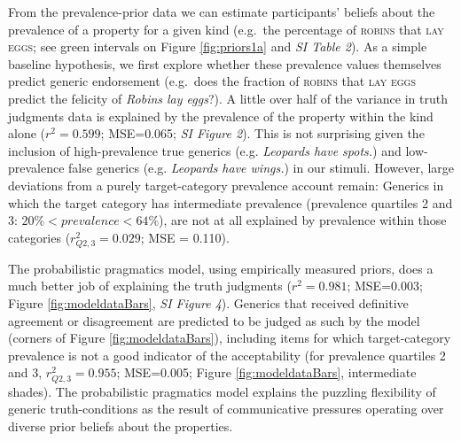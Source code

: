 \documentclass{pnastwo}
\begin{document}
\begin{article}
From the prevalence-prior data we can estimate participants' beliefs about the prevalence of a property for a given kind (e.g.~the percentage of \textsc{robins} that \textsc{lay eggs}; see green intervals on Figure \ref{fig:priors1a} and \emph{SI Table 2}).
As a simple baseline hypothesis, we first explore whether these prevalence values themselves predict generic endorsement (e.g.~does the fraction of \textsc{robins} that \textsc{lay eggs} predict the felicity of \emph{Robins lay eggs}?).
A little over half of the variance in truth judgments data is explained by the prevalence of the property within the kind alone ($r^2 = 0.599$; MSE=0.065; \emph{SI Figure 2}). 
This is not surprising given the inclusion of high-prevalence true generics (e.g. \emph{Leopards have spots.}) and low-prevalence false generics (e.g. \emph{Leopards have wings.}) in our stimuli. 
However, large deviations from a purely target-category prevalence account remain: Generics in which the target category has intermediate prevalence (prevalence quartiles 2 and 3: $ 20\% < prevalence < 64\%$), are not at all explained by prevalence within those categories ($r_{Q2,3}^2 = 0.029$; MSE = 0.110).




The probabilistic pragmatics model, using empirically measured priors, does a much better job of explaining the truth judgments ($r^2=0.981$; MSE=0.003; Figure \ref{fig:modeldataBars}, {\it SI Figure 4}). 
Generics that received definitive agreement or disagreement are predicted to be judged as such by the model (corners of Figure \ref{fig:modeldataBars}), including items for which target-category prevalence is not a good indicator of the acceptability (for prevalence quartiles 2 and 3, $r_{Q2,3}^2=0.955$; MSE=0.005; Figure \ref{fig:modeldataBars}, intermediate shades).
The probabilistic pragmatics model explains the puzzling flexibility of generic truth-conditions as the result of communicative pressures operating over diverse prior beliefs about the properties. 


\end{article}
\end{document}
